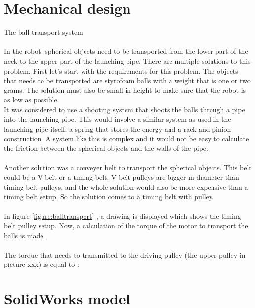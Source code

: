 \documentclass[11pt,twoside,a4paper]{report}
\begin{document}
\section{Mechanical design}
The ball transport system \\
 \\
In the robot, spherical objects need to be transported from the lower part of the neck to the upper part of the launching pipe. There are multiple solutions to this problem. First let’s start with the requirements for this problem. The objects that needs to be transported are styrofoam balls with a weight that is one or two grams. The solution must also be small in height to make sure that the robot is as low as possible.  \\
It was considered to use a shooting system that shoots the balls through a pipe into the launching pipe. This would involve a similar system as used in the launching pipe itself; a spring that stores the energy and a rack and pinion construction. A system like this is complex and it would not be easy to calculate the friction between the spherical objects and the walls of the pipe.\\
\\
Another solution was a conveyer belt to transport the spherical objects. This belt could be a V belt or a timing belt. V belt pulleys are bigger in diameter than timing belt pulleys, and the whole solution would also be more expensive than a timing belt setup. So the solution comes to a timing belt with pulley.\\
\\
In figure \ref{figure:balltransport} , a drawing is displayed which shows the timing belt pulley setup. Now, a calculation of the torque of the motor to transport the balls is made.\\
\\The torque that needs to transmitted to the driving pulley (the upper pulley in picture xxx) is equal to :

\section{SolidWorks model}
\end{document}
